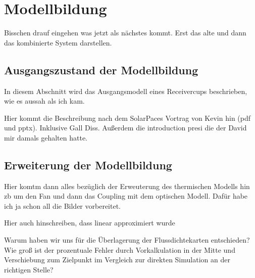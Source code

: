 \chapter{Modellbildung} \label{ch_Modellbildung}
Bisschen drauf eingehen was jetzt als nächstes kommt.
Erst das alte und dann das kombinierte System darstellen.

\section{Ausgangszustand der Modellbildung} \label{sec_Ausgangszustand}
In diesem Abschnitt wird das Ausgangsmodell eines Receivercups beschrieben, wie es aussah als ich kam.


Hier kommt die Beschreibung nach dem SolarPaces Vortrag von Kevin hin (pdf und pptx).
Inklusive Gall Diss. Außerdem die introduction presi die der David mir damals gehalten hatte.

\section{Erweiterung der Modellbildung} \label{sec_ErweiterungModellbildung}
Hier komtm dann alles bezüglich der Erweuterung des thermischen Modells hin zb um den Fan und dann das Coupling mit dem optischen Modell.
Dafür habe ich ja schon all die Bilder vorbereitet.


Hier auch hinschreiben, dass linear approximiert wurde

Warum haben wir uns für die Überlagerung der Flussdichtekarten entschieden?
Wie groß ist der prozentuale Fehler durch Vorkalkulation in der Mitte und Verschiebung zum Zielpunkt im Vergleich zur direkten Simulation an der richtigen Stelle?